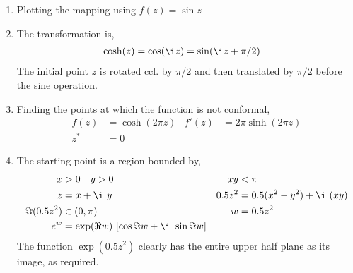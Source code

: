 \begin{enumerate}
    \item Plotting the mapping using $ f(z) = \sin z $
          \begin{figure}[H]
              \centering
          \end{figure}

    \item The transformation is,
          \begin{align}
              \cosh(z) & = \cos(\i z) = \sin(\i z + \pi/2)
          \end{align}
          The initial point $ z $ is rotated ccl. by $ \pi/2 $ and then translated by
          $ \pi/2 $ before the sine operation.

    \item Finding the points at which the function is not conformal,
          \begin{align}
              f(z) & = \cosh(2\pi z) & f'(z) & = 2\pi \sinh(2\pi z) \\
              z^*  & = 0
          \end{align}

    \item The starting point is a region bounded by,
          \begin{align}
              x             & > 0 \quad y > 0                                 &
              xy            & < \pi                                             \\
              z             & = x + \i\ y                                     &
              0.5z^2        & = 0.5(x^2 - y^2) + \i\ (xy)                       \\
              \Im{(0.5z^2)} & \in (0, \pi)                                    &
              w             & = 0.5z^2                                          \\
              e^w           & = \exp(\Re{w})\ [\cos \Im{w} + \i\ \sin \Im{w}]
          \end{align}
          The function $ \exp(0.5z^2) $ clearly has the entire upper half plane as its
          image, as required.


\end{enumerate}
